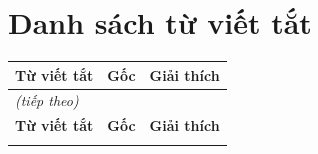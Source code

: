 \chapter*{Danh sách từ viết tắt}

\begin{longtable}{@{}p{3.8cm}p{1.5cm}p{9.2cm}@{}}
\toprule
\textbf{Từ viết tắt} & \textbf{Gốc} & \textbf{Giải thích} \\
\midrule
\endfirsthead
\multicolumn{3}{l}{\small\itshape (tiếp theo)} \\
\toprule
\textbf{Từ viết tắt} & \textbf{Gốc} & \textbf{Giải thích} \\
\midrule
\endhead
\bottomrule
\endlastfoot


\end{longtable}
